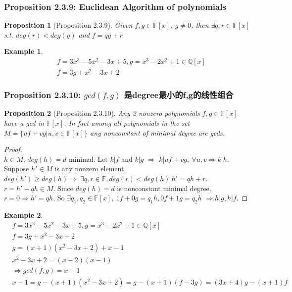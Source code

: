 \documentclass[11pt,a4paper]{article}
\newtheorem{proposition}{Proposition}
\newtheorem{example}{Example}
\begin{document}
\subsubsection{Proposition 2.3.9: Euclidean Algorithm of polynomials}
\begin{proposition}[Proposition 2.3.9]
    Given $f, g \in \mathbb{F}[x]$, $g \neq 0$, then $\exists q, r \in \mathbb{F}[x]$ s.t.
    $deg(r ) < deg(g)$
    and $f = qg + r$
\end{proposition}
\begin{example}
\begin{equation}
    \begin{aligned}
        &f = 3x^3 - 5x^2 - 3x + 5, g = x^3 − 2x^2 + 1 \in \mathbb{Q}[x]\\
        &f=3g+x^2-3x+2
    \end{aligned}
    \nonumber
\end{equation}
\end{example}

\subsubsection{Proposition 2.3.10: $gcd(f,g)$ 是degree最小的f,g的线性组合}
\begin{proposition}[Proposition 2.3.10]
    Any 2 nonzero polynomials $f , g \in \mathbb{F}[x]$ have
    a gcd in $\mathbb{F}[x]$. In fact among all polynomials
    in the set
    $M = \{uf + vg|u, v \in \mathbb{F}[x]\}$
    any nonconstant of minimal degree are gcds.
\end{proposition}
\begin{proof}
\quad\\
$h\in M$, $deg(h)=d$ minimal. Let $k|f$ and $k|g$ $\Rightarrow$ $k|uf+vg,\ \forall u,v\Rightarrow k|h$.\\
Suppose $h'\in M$ is any nonzero element. $deg(h')\geq deg(h)\Rightarrow\ \exists q,r\in\mathbb{F},deg(r)<deg(h)\ h'=qh+r$. $r=h'-qh\in M$. Since $deg(h)=d$ is nonconstant minimal degree, $r=0\Rightarrow h'=qh$. So $\exists q_1,q_2\in\mathbb{F}[x],\ 1f+0g=q_1h, 0f+1g=q_2h$ $\Rightarrow h|g,h|f$.
\end{proof}
\begin{example}
    \begin{equation}
        \begin{aligned}
            &f = 3x^3 - 5x^2 - 3x + 5, g = x^3 − 2x^2 + 1 \in \mathbb{Q}[x]\\
            &f=3g+x^2-3x+2\\
            &g=(x+1)(x^2-3x+2)+x-1\\
            &x^2-3x+2=(x-2)(x-1)\\
            &\Rightarrow gcd(f,g)=x-1\\
            &x-1=g-(x+1)(x^2-3x+2)=g-(x+1)(f-3g)=(3x+4)g-(x+1)f
        \end{aligned}
        \nonumber
    \end{equation}
\end{example}
\end{document}
